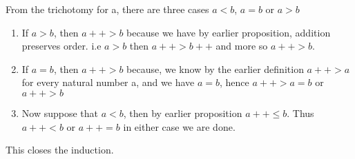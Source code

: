 \documentclass[10pt]{article}
\begin{document}
From the trichotomy for a, there are three cases $a < b$, $a = b$ or $a > b$
\begin{enumerate}
\item If $a>b$, then $a++ > b$ because we have by earlier proposition, addition
  preserves order. i.e $a>b$ then $a++ > b++$ and more so $a++ > b$.

\item If $a = b$, then $a++ > b$ because, we know by the earlier definition $a++
  > a$ for every natural number a, and we have $a=b$, hence $a++>a=b$ or $a++>b$

\item Now suppose that $a<b$, then by earlier proposition $a++ \leq b$. Thus
  $a++<b$ or $a++=b$ in either case we are done.
\end{enumerate}
This closes the induction.
\end{document}
